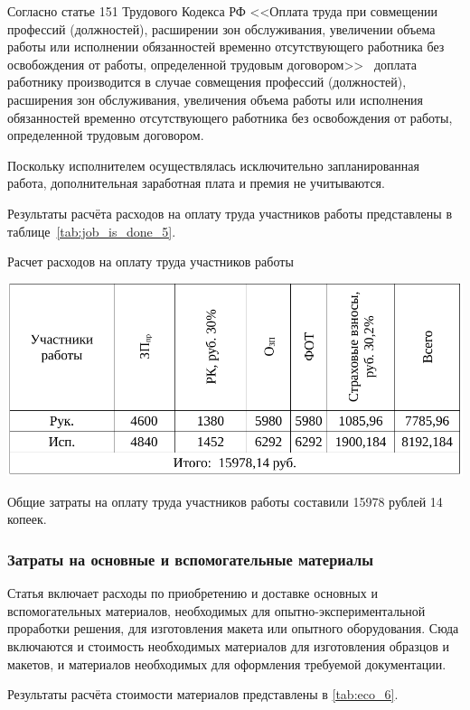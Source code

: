 Согласно статье 151 Трудового Кодекса РФ <<Оплата труда при совмещении профессий (должностей), 
расширении зон обслуживания, увеличении объема работы или исполнении обязанностей 
временно отсутствующего работника без освобождения от работы, определенной трудовым договором>>~\cite{tk_rf}
доплата работнику производится в случае совмещения профессий (должностей), 
расширения зон обслуживания, увеличения объема работы или исполнения 
обязанностей временно отсутствующего работника без освобождения от работы, определенной трудовым договором.

Поскольку исполнителем осуществлялась исключительно запланированная работа, дополнительная заработная
плата и премия не учитываются.

Результаты расчёта расходов на оплату труда участников работы представлены в таблице~\ref{tab:job_is_done_5}.

\begin{table}[!ht]
\caption{Расчет расходов на оплату труда участников работы}
\centering
\includegraphics[page=1, width=1\linewidth]{tables/economics/schedule_5.pdf}
\label{tab:job_is_done_5}
\end{table}
Общие затраты на оплату труда участников работы составили 15978 рублей 14 копеек.


\subsubsection{Затраты на основные и вспомогательные материалы}

Статья включает расходы по приобретению и доставке основных и вспомогательных материалов, необходимых для опытно-экспериментальной проработки 
решения, для изготовления макета или опытного оборудования. Сюда включаются и стоимость необходимых материалов для изготовления образцов и 
макетов, и материалов необходимых для оформления требуемой документации.

Результаты расчёта стоимости материалов представлены в \ref{tab:eco_6}.

